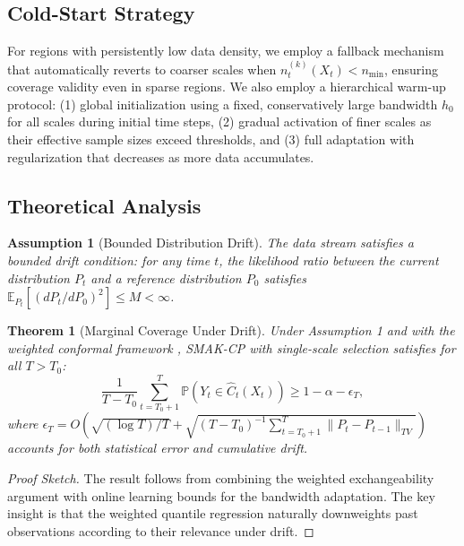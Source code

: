 \documentclass{article}
\newtheorem{theorem}{Theorem}
\newtheorem{assumption}{Assumption}
\theoremstyle{definition}
\begin{document}
\subsection{Cold-Start Strategy}

For regions with persistently low data density, we employ a fallback mechanism that automatically reverts to coarser scales when $n_t^{(k)}(X_t) < n_{\min}$, ensuring coverage validity even in sparse regions. We also employ a hierarchical warm-up protocol: (1) global initialization using a fixed, conservatively large bandwidth $h_0$ for all scales during initial time steps, (2) gradual activation of finer scales as their effective sample sizes exceed thresholds, and (3) full adaptation with regularization that decreases as more data accumulates.

\subsection{Theoretical Analysis}

\begin{assumption}[Bounded Distribution Drift]
The data stream satisfies a bounded drift condition: for any time $t$, the likelihood ratio between the current distribution $P_t$ and a reference distribution $P_0$ satisfies $\mathbb{E}_{P_t}[(dP_t/dP_0)^2] \leq M < \infty$.
\end{assumption}

\begin{theorem}[Marginal Coverage Under Drift]
Under Assumption 1 and with the weighted conformal framework \citep{barber2023conformal}, SMAK-CP with single-scale selection satisfies for all $T > T_0$:
\begin{equation}
\frac{1}{T-T_0}\sum_{t=T_0+1}^{T} \mathbb{P}(Y_t \in \hat{C}_t(X_t)) \geq 1 - \alpha - \epsilon_T,
\end{equation}
where $\epsilon_T = O(\sqrt{(\log T)/T} + \sqrt{(T-T_0)^{-1}\sum_{t=T_0+1}^T \|P_t - P_{t-1}\|_{TV}})$ accounts for both statistical error and cumulative drift.
\end{theorem}

\begin{proof}[Proof Sketch]
The result follows from combining the weighted exchangeability argument \citep{barber2023conformal} with online learning bounds for the bandwidth adaptation. The key insight is that the weighted quantile regression naturally downweights past observations according to their relevance under drift.
\end{proof}
\end{document}
